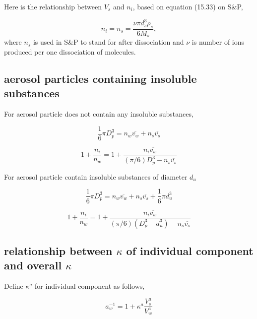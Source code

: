 \documentclass[12pt]{article}
\begin{document}
Here is the relationship between $V_{s}$ and $n_{i}$, based on equation (15.33) on S$\&$P,


\begin{equation}
n_{i}=n_{s}= \frac {\nu \pi d_{s}^{3} \rho_{s} } {6 M_{s}},
\end{equation}
where $n_{s}$ is used in S\&P to stand for after dissociation and $\nu$ is number of ions produced per one  dissociation of molecules.

\subsection{aerosol particles containing insoluble substances}

For aerosol particle does not contain any insoluble substances,

\begin{equation}
\frac{1}{6} \pi D_{p}^{3}=n_{w} \overline{v_{w}} + n_{s} \overline{v_{s}}
\end{equation}

\begin{equation}
1+\frac{n_{i}}{n_{w}}= 1+ \frac{n_{i} \overline{v_{w}}} {(\pi / 6) D_{p}^{3} - n_{s} \overline{v_{s}} }
\end{equation}

For aerosol particle contain insoluble substances of diameter $d_{u}$

\begin{equation}
\frac{1}{6} \pi D_{p}^{3}=n_{w} \overline{v_{w}} + n_{s} \overline{v_{s}} + \frac{1}{6}\pi d_{u}^{3}
\end{equation}

\begin{equation}
1+\frac{n_{i}}{n_{w}}= 1+ \frac{n_{i} \overline{v_{w}}} {(\pi / 6) (D_{p}^{3}-d_{u}^{3} )- n_{s} \overline{v_{s}} }
\end{equation}



\subsection{relationship between $\kappa$ of individual component and overall $\kappa$}


Define $\kappa^{a}$ for individual component as follows, 

\begin{equation}
a_{w}^{-1}=1+\kappa^{a} \frac{V_{s}^{a}}{V_{w}^{a}} 
\end{equation}
\end{document}
